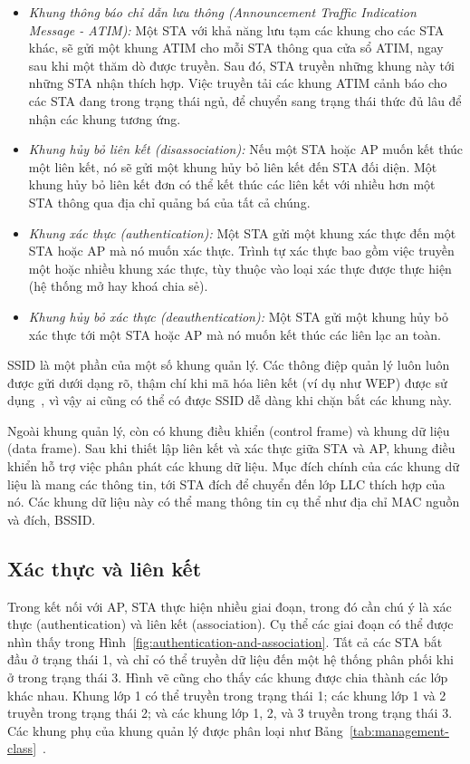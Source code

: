\begin{itemize}
\item \emph{Khung thông báo chỉ dẫn lưu thông (Announcement Traffic Indication Message - ATIM):} \tab Một STA với khả năng lưu tạm các khung cho các STA khác, sẽ gửi một khung ATIM cho mỗi STA thông qua cửa sổ ATIM, ngay sau khi một thăm dò được truyền. Sau đó, STA truyền những khung này tới những STA nhận thích hợp. Việc truyền tải các khung ATIM cảnh báo cho các STA đang trong trạng thái ngủ, để chuyển sang trạng thái thức đủ lâu để nhận các khung tương ứng.

\item \emph{Khung hủy bỏ liên kết (disassociation):} \tab Nếu một STA hoặc AP muốn kết thúc một liên kết, nó sẽ gửi một khung hủy bỏ liên kết đến STA đối diện. Một khung hủy bỏ liên kết đơn có thể kết thúc các liên kết với nhiều hơn một STA thông qua địa chỉ quảng bá của tất cả chúng.

\item \emph{Khung xác thực (authentication):} \tab Một STA gửi một khung xác thực đến một STA hoặc AP mà nó muốn xác thực. Trình tự xác thực bao gồm việc truyền một hoặc nhiều khung xác thực, tùy thuộc vào loại xác thực được thực hiện (hệ thống mở hay khoá chia sẻ).

\item \emph{Khung hủy bỏ xác thực (deauthentication):} \tab Một STA gửi một khung hủy bỏ xác thực tới một STA hoặc AP mà nó muốn kết thúc các liên lạc an toàn.
\end{itemize}

SSID là một phần của một số khung quản lý. Các thông điệp quản lý luôn luôn được gửi dưới dạng rõ, thậm chí khi mã hóa liên kết (ví dụ như WEP) được sử dụng~\cite{gast2005802}, vì vậy ai cũng có thể có được SSID dễ dàng khi chặn bắt các khung này.

Ngoài khung quản lý, còn có khung điều khiển (control frame) và khung dữ liệu (data frame). Sau khi thiết lập liên kết và xác thực giữa STA và AP, khung điều khiển hỗ trợ việc phân phát các khung dữ liệu. Mục đích chính của các khung dữ liệu là mang các thông tin, tới STA đích để chuyển đến lớp LLC thích hợp của nó. Các khung dữ liệu này có thể mang thông tin cụ thể như địa chỉ MAC nguồn và đích, BSSID.

\subsection{Xác thực và liên kết}
Trong kết nối với AP, STA thực hiện nhiều giai đoạn, trong đó cần chú ý là xác thực (authentication) và liên kết (association). Cụ thể các giai đoạn có thể được nhìn thấy trong Hình~\ref{fig:authentication-and-association}. Tất cả các STA bắt đầu ở trạng thái 1, và chỉ có thể truyền dữ liệu đến một hệ thống phân phối khi ở trong trạng thái 3. Hình vẽ cũng cho thấy các khung được chia thành các lớp khác nhau. Khung lớp 1 có thể truyền trong trạng thái 1; các khung lớp 1 và 2 truyền trong trạng thái 2; và các khung lớp 1, 2, và 3 truyền trong trạng thái 3. Các khung phụ của khung quản lý được phân loại như Bảng~\ref{tab:management-class}~\cite{gast2005802}.

